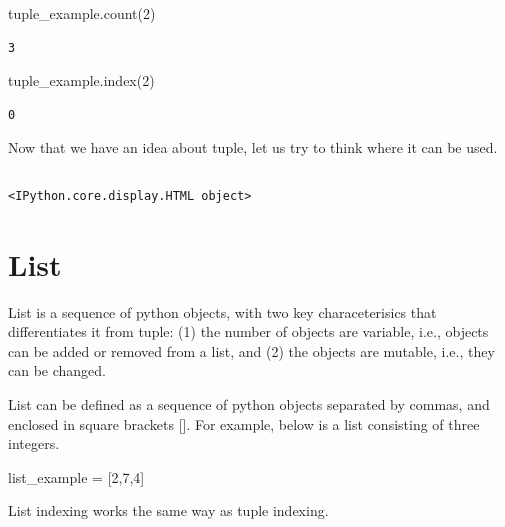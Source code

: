 \documentclass[
  letterpaper,
  DIV=11,
  numbers=noendperiod]{scrreprt}
\newenvironment{Shaded}{\begin{snugshade}}{\end{snugshade}}
\newcommand{\DecValTok}[1]{\textcolor[rgb]{0.68,0.00,0.00}{#1}}
\newcommand{\NormalTok}[1]{\textcolor[rgb]{0.00,0.23,0.31}{#1}}
\newcommand{\OperatorTok}[1]{\textcolor[rgb]{0.37,0.37,0.37}{#1}}
\begin{document}
\begin{Shaded}
\begin{Highlighting}[]
\NormalTok{tuple\_example.count(}\DecValTok{2}\NormalTok{)}
\end{Highlighting}
\end{Shaded}

\begin{verbatim}
3
\end{verbatim}

\begin{Shaded}
\begin{Highlighting}[]
\NormalTok{tuple\_example.index(}\DecValTok{2}\NormalTok{)}
\end{Highlighting}
\end{Shaded}

\begin{verbatim}
0
\end{verbatim}

Now that we have an idea about tuple, let us try to think where it can
be used.

\begin{verbatim}
\end{verbatim}

\begin{verbatim}
<IPython.core.display.HTML object>
\end{verbatim}

\hypertarget{list}{%
\section{List}\label{list}}

List is a sequence of python objects, with two key characeterisics that
differentiates it from tuple: (1) the number of objects are variable,
i.e., objects can be added or removed from a list, and (2) the objects
are mutable, i.e., they can be changed.

List can be defined as a sequence of python objects separated by commas,
and enclosed in square brackets {[}{]}. For example, below is a list
consisting of three integers.

\begin{Shaded}
\begin{Highlighting}[]
\NormalTok{list\_example }\OperatorTok{=}\NormalTok{ [}\DecValTok{2}\NormalTok{,}\DecValTok{7}\NormalTok{,}\DecValTok{4}\NormalTok{]}
\end{Highlighting}
\end{Shaded}

List indexing works the same way as tuple indexing.
\end{document}
